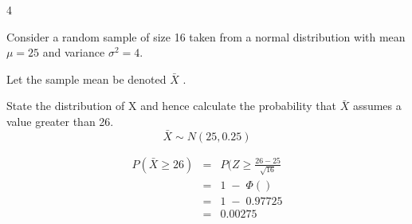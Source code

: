 \documentclass[a4paper,12pt]{article}
\begin{document}
4


Consider a random sample of size 16 taken from a normal distribution with mean $\mu = 25$ and variance $\sigma^2 = 4$. 

Let the sample mean be denoted $\bar{X}$ .


State the distribution of X and hence calculate the probability that $\bar{X}$ assumes a value greater than 26.
\medskip
\[ 
\bar{X} \sim N(25, 0.25) 
\]


\begin{eqnarray*}
P(\bar{X} \geq 26) &=& P(Z \geq \frac{26 - 25 }{\sqrt{16}}\\
&=& 1 \;-\; \Phi() \\
&=& 1 \;-\; 0.97725 \\
&=& 0.00275 \\
\end{eqnarray*}
\end{document}
